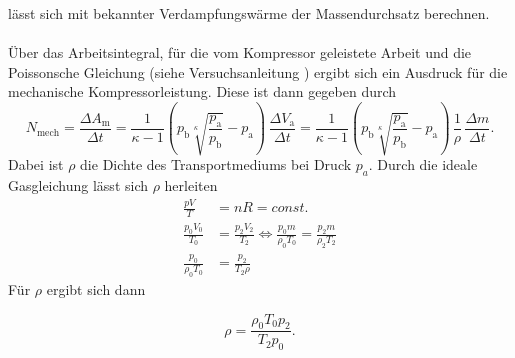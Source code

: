 lässt sich mit bekannter Verdampfungswärme der Massendurchsatz berechnen.\\
\\
Über das Arbeitsintegral, für die vom Kompressor geleistete Arbeit und die Poissonsche Gleichung (siehe Versuchsanleitung \cite{versuchsbeschreibung})
ergibt sich ein Ausdruck für die mechanische Kompressorleistung. Diese ist dann gegeben durch
\begin{equation}
    \label{mechLeistung}
    N_{\text{mech}} = \frac{ΔA_{\text{m}}}{Δt} = \frac{1}{κ - 1}\left(p_{\text{b}}\sqrt[κ]{\frac{p_{\text{a}}}{p_{\text{b}}}} - p_{\text{a}}\right) \, \frac{ΔV_{\text{a}}}{Δt} 
    = \frac{1}{κ - 1}\left(p_{\text{b}}\sqrt[κ]{\frac{p_{\text{a}}}{p_{\text{b}}}} - p_{\text{a}}\right)\,\frac{1}{ρ}\,\frac{Δm}{Δt}.
\end{equation}
Dabei ist $\rho$ die Dichte des Transportmediums bei Druck $p_a$. Durch die ideale Gasgleichung lässt sich $\rho$ herleiten
\begin{align*}
    \frac{pV}{T} &= nR = const.\\
    \frac{p_0V_0}{T_0} &= \frac{p_2V_2}{T_2} \Leftrightarrow \frac{p_0m}{ρ_0T_0} = \frac{p_2m}{ρ_2T_2}\\
    \frac{p_0}{ρ_0T_0} &= \frac{p_2}{T_2ρ} 
\end{align*}
Für $\rho$ ergibt sich dann

\begin{equation}\label{eqn:roh}
    ρ = \frac{ρ_0T_0p_2}{T_2p_0}.
\end{equation}